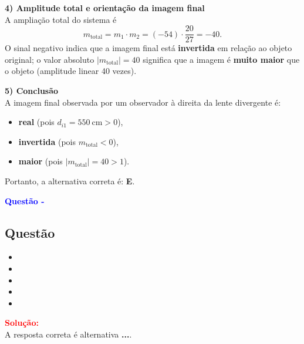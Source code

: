 \begin{flushleft}
\medskip

\textbf{4) Amplitude total e orienta\c{c}\~ao da imagem final} \\
A amplia\c{c}\~ao total do sistema \'e
\[
m_{\text{total}}=m_1\cdot m_2
=(-54)\cdot\frac{20}{27}=-40.
\]
O sinal negativo indica que a imagem final est\'a \textbf{invertida} em rela\c{c}\~ao ao objeto original; o valor absoluto $|m_{\text{total}}|=40$ significa que a imagem \'e \textbf{muito maior} que o objeto (amplitude linear 40 vezes).

\medskip

\textbf{5) Conclus\~ao} \\
A imagem final observada por um observador \`a direita da lente divergente \'e:
\begin{itemize}
  \item \textbf{real} (pois $d_{i1}=550\ \mathrm{cm}>0$),
  \item \textbf{invertida} (pois $m_{\text{total}}<0$),
  \item \textbf{maior} (pois $|m_{\text{total}}|=40>1$).
\end{itemize}

Portanto, a alternativa correta \'e: \colorbox{green!50}{\textbf{E}}.

\end{flushleft}



\begin{flushleft}
\textbf{\textcolor{blue}{\Large Quest\~ao - }}\\
\noindent

\subsection{Quest\~ao }

\begin{itemize}
\item[(A)] 
\item[(B)] 
\item[(C)]
\item[(D)] 
\item[(E)] 
\end{itemize}

\vspace{0.5cm}

\textcolor{red}{\textbf{Solução:}}\\


A resposta correta é alternativa \colorbox{green!50}{\textbf{...}}.

\end{flushleft}




